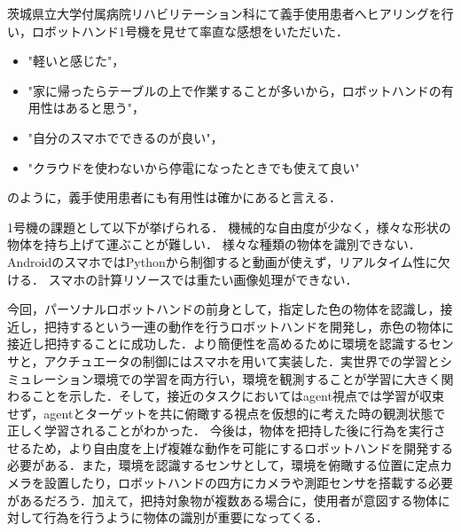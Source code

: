 茨城県立大学付属病院リハビリテーション科にて義手使用患者へヒアリングを行い，ロボットハンド1号機を見せて率直な感想をいただいた．
\begin{itemize}
    \item "軽いと感じた"，
    \item "家に帰ったらテーブルの上で作業することが多いから，ロボットハンドの有用性はあると思う"，
    \item "自分のスマホでできるのが良い"，
    \item "クラウドを使わないから停電になったときでも使えて良い"
\end{itemize}
のように，義手使用患者にも有用性は確かにあると言える．

1号機の課題として以下が挙げられる．
機械的な自由度が少なく，様々な形状の物体を持ち上げて運ぶことが難しい．
様々な種類の物体を識別できない．
AndroidのスマホではPythonから制御すると動画が使えず，リアルタイム性に欠ける．
スマホの計算リソースでは重たい画像処理ができない．



今回，パーソナルロボットハンドの前身として，指定した色の物体を認識し，接近し，把持するという一連の動作を行うロボットハンドを開発し，赤色の物体に接近し把持することに成功した．より簡便性を高めるために環境を認識するセンサと，アクチュエータの制御にはスマホを用いて実装した．実世界での学習とシミュレーション環境での学習を両方行い，環境を観測することが学習に大きく関わることを示した．そして，接近のタスクにおいてはagent視点では学習が収束せず，agentとターゲットを共に俯瞰する視点を仮想的に考えた時の観測状態で正しく学習されることがわかった．
今後は，物体を把持した後に行為を実行させるため，より自由度を上げ複雑な動作を可能にするロボットハンドを開発する必要がある．また，環境を認識するセンサとして，環境を俯瞰する位置に定点カメラを設置したり，ロボットハンドの四方にカメラや測距センサを搭載する必要があるだろう．加えて，把持対象物が複数ある場合に，使用者が意図する物体に対して行為を行うように物体の識別が重要になってくる．



